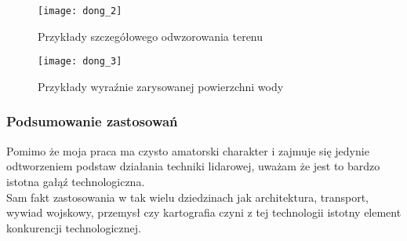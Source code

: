 \begin{figure}
    \centering
    \texttt{[image: dong\_2]}
    \caption{Przykłady szczegółowego odwzorowania terenu \cite{dong}}
    \label{fig:dong_2}
\end{figure}

\begin{figure}
    \centering
    \texttt{[image: dong\_3]}
    \caption{Przykłady wyraźnie zarysowanej powierzchni wody \cite{dong}}
    \label{fig:dong_3}
\end{figure}

\newpage
\newpage
\subsubsection{Podsumowanie zastosowań}
Pomimo że moja praca ma czysto amatorski charakter i zajmuje się jedynie odtworzeniem podstaw działania techniki lidarowej, uważam że jest to bardzo istotna gałąź technologiczna.\\

Sam fakt zastosowania w tak wielu dziedzinach jak architektura, transport, wywiad wojskowy, przemysł czy kartografia czyni z tej technologii istotny element konkurencji technologicznej.